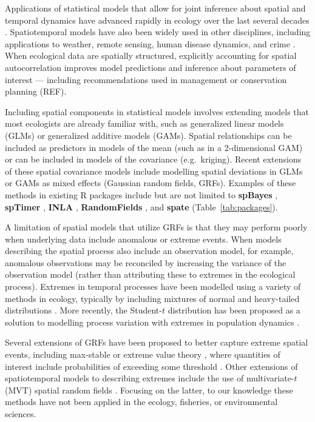 \documentclass[12pt,english]{article}
\begin{document}
\begin{spacing}{1.9}

Applications of statistical models that allow for joint inference about spatial
and temporal dynamics have advanced rapidly in ecology over the last several
decades \citep[e.g.][]{bascompte1995, latimer2009}. Spatiotemporal models have
also been widely used in other disciplines, including applications to weather,
remote sensing, human disease dynamics, and crime \citep{cressie2011}. When
ecological data are spatially structured, explicitly accounting for spatial
autocorrelation improves model predictions and inference about parameters of
interest --- including recommendations used in management or conservation
planning (REF).

Including spatial components in statistical models involves extending models
that most ecologists are already familiar with, such as generalized linear
models (GLMs) or generalized additive models (GAMs). Spatial relationships can
be included as predictors in models of the mean (such as in a 2-dimensional
GAM) or can be included in models of the covariance (e.g.\ kriging). Recent
extensions of these spatial covariance models include modelling spatial
deviations in GLMs or GAMs as mixed effects (Gaussian random
fields, GRFs). Examples of these methods in existing R packages include but are not
limited to \textbf{spBayes} \citep{finley2007}, \textbf{spTimer}
\citep{bakar2015}, \textbf{INLA} \citep{rue2009}, \textbf{RandomFields}
\citep{schlather2016}, and \textbf{spate} \citep{sigrist2015}
(Table~\ref{tab:packages}).

A limitation of spatial models that utilize GRFs is that they
may perform poorly when underlying data include anomalous or extreme events.
When models describing the spatial process also include an observation model,
for example, anomalous observations may be reconciled by increasing the variance
of the observation model (rather than attributing these to extremes in the
ecological process). Extremes in temporal processes have been modelled using a
variety of methods in ecology, typically by including mixtures of normal and
heavy-tailed distributions \citep[e.g.][]{everitt1996, ward2007, thorson2011}.
More recently, the Student-$t$ distribution has been proposed as a
solution to modelling process variation with extremes in population dynamics
\citep{anderson2017}.

Several extensions of GRFs have been proposed to better capture
extreme spatial events, including max-stable or extreme value theory
\citep{davison2012, davison2012a}, where quantities of interest include probabilities
of exceeding some threshold \citep{davis2008}. Other extensions of spatiotemporal
models to describing extremes include the use of multivariate-$t$ (MVT) spatial
random fields \citep{roislien2007}. Focusing on the latter, to our knowledge these
methods have not been applied in the ecology, fisheries, or environmental sciences.


\end{spacing}
\end{document}
